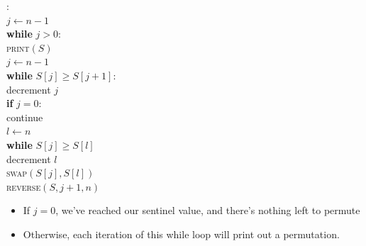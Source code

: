 \documentclass[aspectratio=169]{beamer}
\begin{document}
\begin{frame}{}
\begin{minipage}[c]{0.6\textwidth}
\begin{nalgo}
: 
\\\label{}  $j \gets n-1$
\\\label{}  \textbf{while} $j > 0$:\+
\\\label{}      \textsc{print}$(S)$
\\\label{}{\color{lightgray}      $j \gets n-1$}
\\\label{}{\color{lightgray}      \textbf{while} $S[j] \geq S[j+1]$:\+}
\\\label{}{\color{lightgray}          decrement $j$\-}
\\\label{}{\color{lightgray}      \textbf{if} $j = 0$: \+}
\\\label{}{\color{lightgray}          continue \-}
\\\label{}{\color{lightgray}      $l \gets n$}
\\\label{}{\color{lightgray}      \textbf{while} $S[j] \geq S[l]$ \+}
\\\label{}{\color{lightgray}          decrement $l$\-}
\\\label{}{\color{lightgray}      \textsc{swap}$(S[j], S[l])$}
\\\label{}{\color{lightgray}      \textsc{reverse}$(S, j+1, n)$}
\end{nalgo}
\end{minipage}
\begin{minipage}[c]{0.35\textwidth}
\begin{itemize}
    \item If $j=0$, we've reached our sentinel value, and there's nothing left to permute \pause
    \item Otherwise, each iteration of this while loop will print out a permutation. 
\end{itemize}
\end{minipage}
\end{frame}
\end{document}
